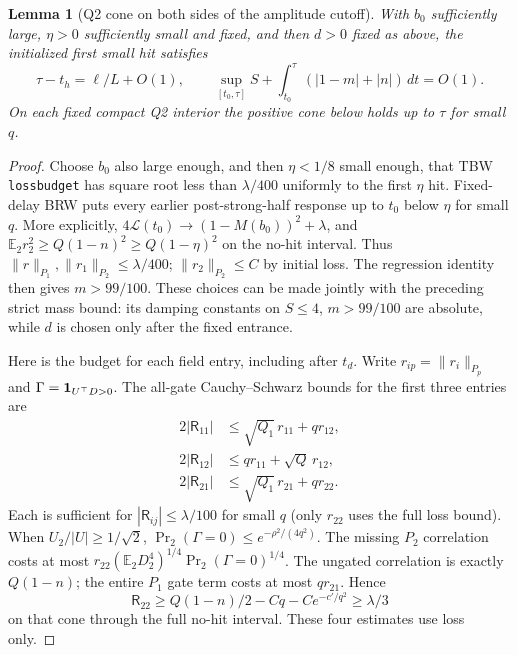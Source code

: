 \documentclass[11pt]{article}
\newtheorem{lemma}{Lemma}
\newcommand{\dt}{\,dt}
\newcommand{\Ll}{\mathcal L}
\newcommand{\E}{\mathbb E}
\begin{document}
\begin{lemma}[Q2 cone on both sides of the amplitude cutoff]\label{an04ce5v2:conelemma}
With $b_0$ sufficiently large, $\eta>0$ sufficiently small and fixed, and then $d>0$ fixed as above, the initialized first small hit satisfies
\begin{equation}\label{an04ce5v2:smallhit}
 \tau-t_h=\ell/L+O(1),\qquad
 \sup_{[t_0,\tau]}S+\int_{t_0}^{\tau}(|1-m|+|n|)\dt=O(1).
\end{equation}
On each fixed compact Q2 interior the positive cone below holds up to $\tau$ for small $q$.
\end{lemma}
\begin{proof}
Choose $b_0$ also large enough, and then $\eta<1/8$ small enough, that TBW \texttt{lossbudget} has square root less than $\lambda/400$ uniformly to the first $\eta$ hit. Fixed-delay BRW puts every earlier post-strong-half response up to $t_0$ below $\eta$ for small $q$. More explicitly, $4\Ll(t_0)\to(1-M(b_0))^2+\lambda$, and $\E_2 r_2^2\ge Q(1-n)^2\ge Q(1-\eta)^2$ on the no-hit interval. Thus
$\|r\|_{P_1},\|r_1\|_{P_2}\le\lambda/400$; $\|r_2\|_{P_2}\le C$ by initial loss. The regression identity then gives $m>99/100$. These choices can be made jointly with the preceding strict mass bound: its damping constants on $S\le4$, $m>99/100$ are absolute, while $d$ is chosen only after the fixed entrance.

Here is the budget for each field entry, including after $t_d$. Write $r_{ip}=\|r_i\|_{P_p}$ and $\Gamma={\bf1}_{U^\top D>0}$. The all-gate Cauchy--Schwarz bounds for the first three entries are
\[
 \begin{aligned}
 2|\mathsf R_{11}|&\le\sqrt{Q_1}\,r_{11}+q r_{12},\\
 2|\mathsf R_{12}|&\le q r_{11}+\sqrt Q\,r_{12},\\
 2|\mathsf R_{21}|&\le\sqrt{Q_1}\,r_{21}+q r_{22}.
 \end{aligned}
\]
Each is sufficient for $|\mathsf R_{ij}|\le\lambda/100$ for small $q$ (only $r_{22}$ uses the full loss bound). When $U_2/|U|\ge1/\sqrt2$, $\Pr_2(\Gamma=0)\le e^{-\rho^2/(4q^2)}$. The missing $P_2$ correlation costs at most $r_{22}(\E_2 D_2^4)^{1/4}\Pr_2(\Gamma=0)^{1/4}$. The ungated correlation is exactly $Q(1-n)$; the entire $P_1$ gate term costs at most $q r_{21}$. Hence
\[
 \mathsf R_{22}\ge Q(1-n)/2-Cq-Ce^{-c'/q^2}\ge\lambda/3
\]
on that cone through the full no-hit interval. These four estimates use loss only.


\end{proof}
\end{document}
